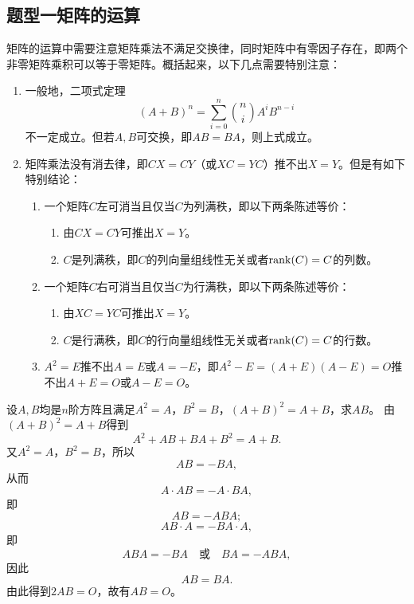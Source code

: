 \subsection*{题型一\quad 矩阵的运算}
矩阵的运算中需要注意矩阵乘法不满足交换律，同时矩阵中有零因子存在，即两个非零矩阵乘积可以等于零矩阵。概括起来，以下几点需要特别注意：
\begin{enumerate}[label=（\arabic*）]
\item 一般地，二项式定理
\[
(A+B)^n=\sum_{i=0}^n\binom ni A^iB^{n-i}
\]
不一定成立。但若$A,B$可交换，即$AB=BA$，则上式成立。
\item 矩阵乘法没有消去律，即$CX=CY$（或$XC=YC$）推不出$X=Y$。但是有如下特别结论：
\begin{enumerate}[label=（\roman*）]
\item 一个矩阵$C$左可消当且仅当$C$为列满秩，即以下两条陈述等价：
\begin{enumerate}[label=（\alph*）]
\item 由$CX=CY$可推出$X=Y$。
\item $C$是列满秩，即$C$的列向量组线性无关或者$\operatorname{rank}(C)=C$的列数。
\end{enumerate}
\item 一个矩阵$C$右可消当且仅当$C$为行满秩，即以下两条陈述等价：
\begin{enumerate}[label=（\alph*）]
\item 由$XC=YC$可推出$X=Y$。
\item $C$是行满秩，即$C$的行向量组线性无关或者$\operatorname{rank}(C)=C$的行数。
\end{enumerate}
\item $A^2=E$推不出$A=E$或$A=-E$，即$A^2-E=(A+E)(A-E)=O$推不出$A+E=O$或$A-E=O$。
\end{enumerate}
\end{enumerate}

设$A,B$均是$n$阶方阵且满足$A^2=A$，$B^2=B$，$(A+B)^2=A+B$，求$AB$。
\sol 由$(A+B)^2=A+B$得到
\[A^2+AB+BA+B^2=A+B.\]
又$A^2=A$，$B^2=B$，所以
\[AB=-BA,\]
从而
\[A\cdot AB=-A\cdot BA,\]
即
\[AB=-ABA;\]
\[AB\cdot A=-BA\cdot A,\]
即
\[ABA=-BA\quad\text{或}\quad BA=-ABA,\]
因此
\[AB=BA.\]
由此得到$2AB=O$，故有$AB=O$。


